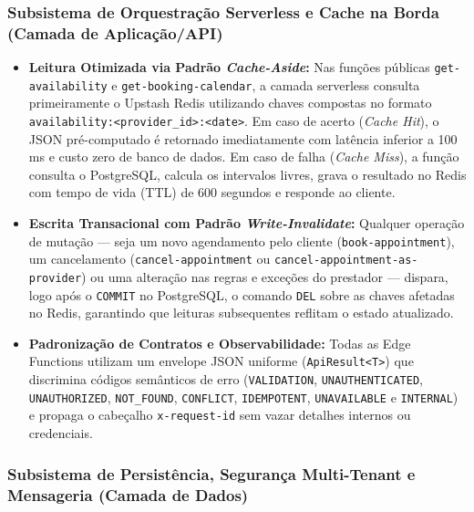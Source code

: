 \documentclass[12pt,a4paper]{article}
\begin{document}
\subsubsection{Subsistema de Orquestração Serverless e Cache na Borda (Camada de Aplicação/API)}

\begin{itemize}
    \item \textbf{Leitura Otimizada via Padrão \textit{Cache-Aside}:} Nas funções públicas \texttt{get-availability} e \texttt{get-booking-calendar}, a camada serverless consulta primeiramente o Upstash Redis utilizando chaves compostas no formato \texttt{availability:<provider\_id>:<date>}. Em caso de acerto (\textit{Cache Hit}), o JSON pré-computado é retornado imediatamente com latência inferior a 100 ms e custo zero de banco de dados. Em caso de falha (\textit{Cache Miss}), a função consulta o PostgreSQL, calcula os intervalos livres, grava o resultado no Redis com tempo de vida (TTL) de 600 segundos e responde ao cliente.
    \item \textbf{Escrita Transacional com Padrão \textit{Write-Invalidate}:} Qualquer operação de mutação --- seja um novo agendamento pelo cliente (\texttt{book-appointment}), um cancelamento (\texttt{cancel-appointment} ou \texttt{cancel-appointment-as-provider}) ou uma alteração nas regras e exceções do prestador --- dispara, logo após o \texttt{COMMIT} no PostgreSQL, o comando \texttt{DEL} sobre as chaves afetadas no Redis, garantindo que leituras subsequentes reflitam o estado atualizado.
    \item \textbf{Padronização de Contratos e Observabilidade:} Todas as Edge Functions utilizam um envelope JSON uniforme (\texttt{ApiResult<T>}) que discrimina códigos semânticos de erro (\texttt{VALIDATION}, \texttt{UNAUTHENTICATED}, \texttt{UNAUTHORIZED}, \texttt{NOT_FOUND}, \texttt{CONFLICT}, \texttt{IDEMPOTENT}, \texttt{UNAVAILABLE} e \texttt{INTERNAL}) e propaga o cabeçalho \texttt{x-request-id} sem vazar detalhes internos ou credenciais.
\end{itemize}

\subsubsection{Subsistema de Persistência, Segurança Multi-Tenant e Mensageria (Camada de Dados)}
\end{document}
